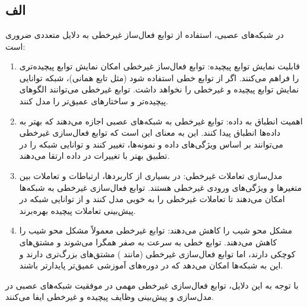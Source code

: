 \documentclass{article}
\begin{document}
\section{}
\subsection{الف}
در شبکه‌های عصبی، استفاده از توابع فعال‌ساز غیرخطی به دلایل متعددی ضروری است:
\begin{enumerate}
\item    قابلیت نمایش توابع پیچیده: توابع فعال‌ساز غیرخطی امکان نمایش توابع پیچیده‌تری را فراهم می‌کنند. اگر از توابع خطی استفاده شود (مثل تابع همانی)، شبکه توانایی نمایش توابع پیچیده و غیرخطی را نخواهد داشت. توابع غیرخطی می‌توانند الگوهای پیچیده‌تر و ساختارهای عمیق‌تر را مدل کنند.

\item    اهمیت انطباق به داده: توابع غیرخطی به شبکه‌های عصبی اجازه می‌دهند که بهتر به داده‌ها انطباق پیدا کنند. این به معنای این است که توابع فعال‌سازی غیرخطی می‌توانند بر اساس ویژگی‌های داده و نمونه‌ها، تغییر کنند و توانایی شبکه را در تطبیق بهتر با تغییرات در داده ارتقا می‌دهند.

\item    مدل‌سازی تعاملات غیرخطی: در بسیاری از کاربردها، ارتباطات و تعاملات بین متغیرها و ویژگی‌های ورودی غیرخطی هستند. توابع فعال‌سازی غیرخطی به شبکه‌ها امکان می‌دهند تا تعاملات غیرخطی را به خوبی مدل کنند و از توانایی شبکه در پیش‌بینی تعاملات پیچیده بهره‌برند.

\item    مشکل محو شیب را کاهش می‌دهند: توابع غیرخطی معمولاً مشکل محو شیب را کاهش می‌دهند. توابع خطی به سرعت به صفر همگرا می‌شوند و مشتق‌های کوچکی دارند، اما توابع فعال‌سازی غیرخطی (مانند ) مشتق‌های بزرگ‌تری دارند و این به شبکه‌ها امکان می‌دهد که در دوره‌های آموزشی عمیق‌تر پایدارتر باشند.
\end{enumerate}

با توجه به این دلایل، توابع فعال‌سازی غیرخطی مهمی در موفقیت شبکه‌های عصبی در مدل‌سازی و پیش‌بینی وظایف پیچیده و غیرخطی ایفا می‌کنند.
\end{document}
